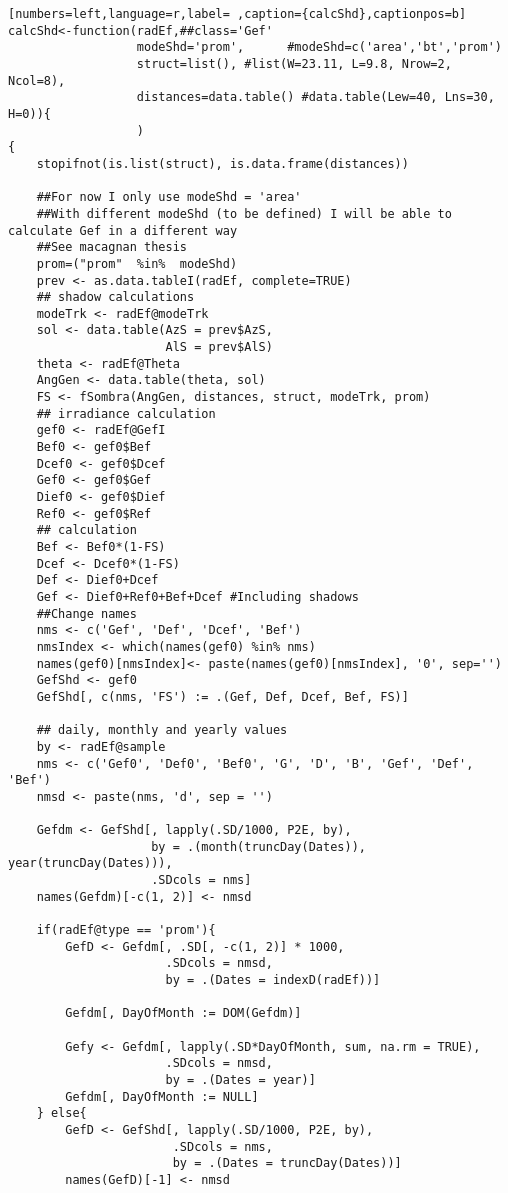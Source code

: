 \begin{lstlisting}[numbers=left,language=r,label= ,caption={calcShd},captionpos=b]
calcShd<-function(radEf,##class='Gef'
                  modeShd='prom',      #modeShd=c('area','bt','prom')
                  struct=list(), #list(W=23.11, L=9.8, Nrow=2, Ncol=8), 
                  distances=data.table() #data.table(Lew=40, Lns=30, H=0)){
                  )
{
    stopifnot(is.list(struct), is.data.frame(distances))

    ##For now I only use modeShd = 'area'
    ##With different modeShd (to be defined) I will be able to calculate Gef in a different way
    ##See macagnan thesis
    prom=("prom"  %in%  modeShd)
    prev <- as.data.tableI(radEf, complete=TRUE)
    ## shadow calculations
    modeTrk <- radEf@modeTrk
    sol <- data.table(AzS = prev$AzS,
                      AlS = prev$AlS)
    theta <- radEf@Theta
    AngGen <- data.table(theta, sol)
    FS <- fSombra(AngGen, distances, struct, modeTrk, prom)
    ## irradiance calculation
    gef0 <- radEf@GefI
    Bef0 <- gef0$Bef
    Dcef0 <- gef0$Dcef
    Gef0 <- gef0$Gef
    Dief0 <- gef0$Dief
    Ref0 <- gef0$Ref
    ## calculation
    Bef <- Bef0*(1-FS)
    Dcef <- Dcef0*(1-FS)
    Def <- Dief0+Dcef
    Gef <- Dief0+Ref0+Bef+Dcef #Including shadows
    ##Change names
    nms <- c('Gef', 'Def', 'Dcef', 'Bef')
    nmsIndex <- which(names(gef0) %in% nms)
    names(gef0)[nmsIndex]<- paste(names(gef0)[nmsIndex], '0', sep='')
    GefShd <- gef0
    GefShd[, c(nms, 'FS') := .(Gef, Def, Dcef, Bef, FS)]

    ## daily, monthly and yearly values
    by <- radEf@sample
    nms <- c('Gef0', 'Def0', 'Bef0', 'G', 'D', 'B', 'Gef', 'Def', 'Bef')
    nmsd <- paste(nms, 'd', sep = '')

    Gefdm <- GefShd[, lapply(.SD/1000, P2E, by),
                    by = .(month(truncDay(Dates)), year(truncDay(Dates))),
                    .SDcols = nms]
    names(Gefdm)[-c(1, 2)] <- nmsd

    if(radEf@type == 'prom'){
        GefD <- Gefdm[, .SD[, -c(1, 2)] * 1000,
                      .SDcols = nmsd,
                      by = .(Dates = indexD(radEf))] 

        Gefdm[, DayOfMonth := DOM(Gefdm)]

        Gefy <- Gefdm[, lapply(.SD*DayOfMonth, sum, na.rm = TRUE),
                      .SDcols = nmsd,
                      by = .(Dates = year)]
        Gefdm[, DayOfMonth := NULL]
    } else{    
        GefD <- GefShd[, lapply(.SD/1000, P2E, by),
                       .SDcols = nms,
                       by = .(Dates = truncDay(Dates))]
        names(GefD)[-1] <- nmsd


\end{lstlisting}

